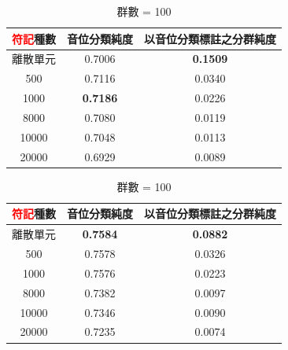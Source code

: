 {{        \begin{table}[!htbp]
            \centering

            \begin{subtable}[t]{\textwidth}
                \centering
                \begin{tabular}{|c|c|c|} \hline
                    \textbf{\textcolor{red}{符記}}種數  & 音位分類純度    & 以音位分類標註之分群純度    \\ \hline
                                     離散單元  &         0.7006  &            \textbf{0.1509}  \\ \hline
                                         500   &         0.7116  &                    0.0340   \\ \hline
                                        1000   & \textbf{0.7186} &                    0.0226   \\ \hline
                                        8000   &         0.7080  &                    0.0119   \\ \hline
                                       10000   &         0.7048  &                    0.0113   \\ \hline
                                       20000   &         0.6929  &                    0.0089   \\ \hline
                \end{tabular}
                \caption{群數 = 50}
                \label{subtab:ch4-new-hubert-pcls-clu050}
            \end{subtable}

            \vfill

            \begin{subtable}[t]{\textwidth}
                \centering
                \begin{tabular}{|c|c|c|} \hline
                    \textbf{\textcolor{red}{符記}}種數  & 音位分類純度    & 以音位分類標註之分群純度 \\ \hline
                                     離散單元  & \textbf{0.7584} & \textbf{0.0882}          \\ \hline
                                          500  &        0.7578   &         0.0326           \\ \hline
                                         1000  &        0.7576   &         0.0223           \\ \hline
                                         8000  &        0.7382   &         0.0097           \\ \hline
                                        10000  &        0.7346   &         0.0090           \\ \hline
                                        20000  &        0.7235   &         0.0074           \\ \hline
                \end{tabular}
                \caption{群數 = 100}
                \label{subtab:ch4-new-hubert-pcls-clu100}
            \end{subtable}


\end{table}}}

